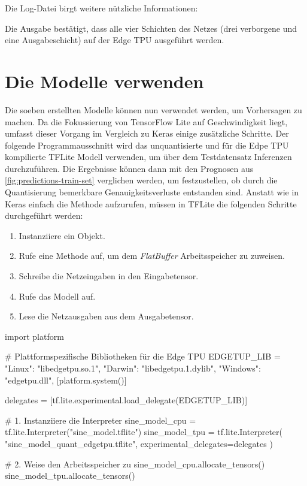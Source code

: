 Die Log-Datei birgt weitere nützliche Informationen:
Die Ausgabe bestätigt, dass alle vier Schichten des Netzes
(drei verborgene und eine Ausgabeschicht)
auf der Edge TPU ausgeführt werden.

\section{Die Modelle verwenden}
Die soeben erstellten Modelle können nun verwendet werden, um
Vorhersagen zu machen.
Da die Fokussierung von TensorFlow Lite auf Geschwindigkeit
liegt, umfasst dieser Vorgang im Vergleich zu Keras einige
zusätzliche Schritte. Der folgende Programmausschnitt
wird das unquantisierte und für die Edpe TPU
kompilierte TFLite Modell verwenden, um über dem Testdatensatz Inferenzen
durchzuführen. Die Ergebnisse können dann mit den Prognosen
aus \autoref{fig:predictions-train-set} verglichen werden,
um festzustellen, ob durch die Quantisierung bemerkbare
Genauigkeitsverluste entstanden sind.
Anstatt wie in Keras einfach die 
Methode aufzurufen, müssen in TFLite die folgenden
Schritte durchgeführt werden:
\begin{enumerate}
  \item Instanziiere ein  Objekt.
  \item Rufe eine Methode auf, um dem
        \textit{FlatBuffer} Arbeitsspeicher zu zuweisen.
  \item Schreibe die Netzeingaben in den Eingabetensor.
  \item Rufe das Modell auf.
  \item Lese die Netzausgaben aus dem Ausgabetensor.
\end{enumerate}
\begin{pythoncode}
import platform

# Plattformspezifische Bibliotheken für die Edge TPU
EDGETUP_LIB = {
    "Linux": "libedgetpu.so.1",
    "Darwin": "libedgetpu.1.dylib",
    "Windows": "edgetpu.dll",
}[platform.system()]

delegates = [tf.lite.experimental.load_delegate(EDGETUP_LIB)]

# 1. Instanziiere die Interpreter
sine_model_cpu = tf.lite.Interpreter("sine_model.tflite")
sine_model_tpu = tf.lite.Interpreter(
    "sine_model_quant_edgetpu.tflite",
    experimental_delegates=delegates
)

# 2. Weise den Arbeitsspeicher zu
sine_model_cpu.allocate_tensors()
sine_model_tpu.allocate_tensors()
\end{pythoncode}